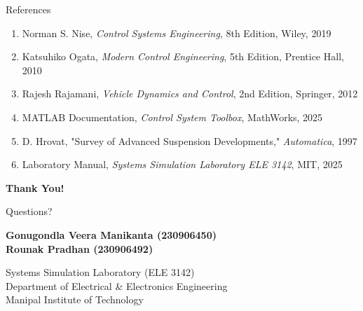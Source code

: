 \documentclass[aspectratio=169]{beamer}
\begin{document}
\begin{frame}{References}
  \footnotesize
  \begin{enumerate}
    \item Norman S. Nise, \textit{Control Systems Engineering}, 8th Edition, Wiley, 2019
    \item Katsuhiko Ogata, \textit{Modern Control Engineering}, 5th Edition, Prentice Hall, 2010
    \item Rajesh Rajamani, \textit{Vehicle Dynamics and Control}, 2nd Edition, Springer, 2012
    \item MATLAB Documentation, \textit{Control System Toolbox}, MathWorks, 2025
    \item D. Hrovat, "Survey of Advanced Suspension Developments," \textit{Automatica}, 1997
    \item Laboratory Manual, \textit{Systems Simulation Laboratory ELE 3142}, MIT, 2025
  \end{enumerate}
\end{frame}

\begin{frame}[plain]
  \begin{center}
    \Huge{\textcolor{mitblue}{\textbf{Thank You!}}}
    
    \vspace{1cm}
    
    \Large{Questions?}
    
    \vspace{1.5cm}
    
    \normalsize
    \textbf{Gonugondla Veera Manikanta (230906450)} \\
    \textbf{Rounak Pradhan (230906492)}
    
    \vspace{0.5cm}
    
    Systems Simulation Laboratory (ELE 3142) \\
    Department of Electrical \& Electronics Engineering \\
    Manipal Institute of Technology
  \end{center}
\end{frame}
\end{document}
